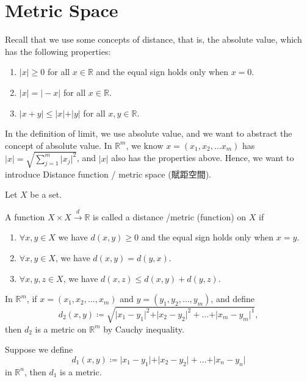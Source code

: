 \section{Metric Space}
Recall that we use some concepts of distance, that is, the absolute value, which has the following properties:
\begin{enumerate}
    \item \(\vert x \vert \geq 0 \) for all \(x \in \mathbb{R} \) and the equal sign holds only when \(x=0\). 
    \item \(\vert x \vert = \vert -x \vert \) for all \(x \in \mathbb{R} \). 
    \item \(\vert x + y \vert  \le \vert x \vert + \vert y \vert \) for all \(x,y \in \mathbb{R} \).    
\end{enumerate}
In the definition of limit, we use absolute value, and we want to abstract the concept of absolute value. In \(\mathbb{R} ^m\), we know \(x=(x_1, x_2, \dots x_m)\) has \(\vert x \vert = \sqrt{\sum_{j=1}^m \vert x_j \vert^2  }  \), and \(\vert x \vert \) also has the properties above.  Hence, we want to introduce Distance function / metric space (賦距空間). 

Let \(X\) be a set. 
\begin{definition} \label{dfn: metric}
    A function \(X \times X \xrightarrow{d} \mathbb{R} \) is called a distance /metric (function) on \(X\) if 
    \begin{enumerate}
        \item \(\forall x, y \in X\) we have \(d(x,y) \ge 0\) and the equal sign holds only when \(x = y\). 
        \item \(\forall x,y \in X\), we have \(d(x,y) = d(y,x)\). 
        \item \(\forall x,y,z \in X\), we have \(d(x,z) \le d(x,y) + d(y,z)\).       
    \end{enumerate} 
\end{definition} 

\begin{eg}
    In \(\mathbb{R} ^m\), if \(x = (x_1, x_2, \dots , x_m)\) and \(y = (y_1, y_2, \dots , y_m)\), and define
    \[
        d_2(x,y) \coloneqq \sqrt{\vert x_1 - y_1 \vert^2 + \vert x_2 - y_2 \vert^2 + \dots + \vert x_m - y_m \vert^1   },
    \] then \(d_2\) is a metric on \(\mathbb{R} ^m\) by Cauchy inequality.  
\end{eg}

\begin{eg}
    Suppose we define 
    \[
        d_1(x,y) \coloneqq \vert x_1 - y_1 \vert + \vert x_2 - y_2 \vert + \dots + \vert x_n - y_n \vert   
    \] in \(\mathbb{R} ^n\), then \(d_1\) is a metric.  
\end{eg}

